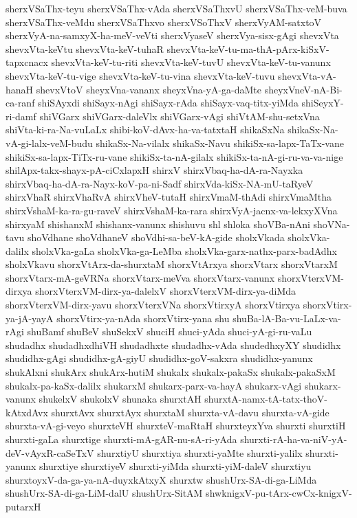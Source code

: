 {sherxVSaThx-teyu
sherxVSaThx-vAda
sherxVSaThxvU
sherxVSaThx-veM-buva
sherxVSaThx-veMdu
sherxVSaThxvo
sherxVSoThxV
sherxVyAM-satxtoV
sherxVyA-na-samxyX-ha-meV-veVti
sherxVyaseV
sherxVya-sisx-gAgi
shevxVta
shevxVta-keVtu
shevxVta-keV-tuhaR
shevxVta-keV-tu-ma-thA-pArx-kiSxV-tapxcnacx
shevxVta-keV-tu-riti
shevxVta-keV-tuvU
shevxVta-keV-tu-vanunx
shevxVta-keV-tu-vige
shevxVta-keV-tu-vina
shevxVta-keV-tuvu
shevxVta-vA-hanaH
shevxVtoV
sheyxVna-vananx
sheyxVna-yA-ga-daMte
sheyxVneV-nA-Bi-ca-ranf
shiSAyxdi
shiSayx-nAgi
shiSayx-rAda
shiSayx-vaq-titx-yiMda
shiSeyxY-ri-damf
shiVGarx
shiVGarx-daleVlx
shiVGarx-vAgi
shiVtAM-shu-setxVna
shiVta-ki-ra-Na-vuLaLx
shibi-koV-dAvx-ha-va-tatxtaH
shikaSxNa
shikaSx-Na-vA-gi-lalx-veM-budu
shikaSx-Na-vilalx
shikaSx-Navu
shikiSx-sa-lapx-TaTx-vane
shikiSx-sa-lapx-TiTx-ru-vane
shikiSx-ta-nA-gilalx
shikiSx-ta-nA-gi-ru-va-va-nige
shilApx-takx-shayx-pA-ciCxlapxH
shirxV
shirxVbaq-ha-dA-ra-Nayxka
shirxVbaq-ha-dA-ra-Nayx-koV-pa-ni-Sadf
shirxVda-kiSx-NA-mU-taRyeV
shirxVhaR
shirxVhaRvA
shirxVheV-tutaH
shirxVmaM-thAdi
shirxVmaMtha
shirxVshaM-ka-ra-gu-raveV
shirxVshaM-ka-rara
shirxVyA-jacnx-va-lekxyXVna
shirxyaM
shishanxM
shishanx-vanunx
shishuvu
shl
shloka
shoVBa-nAni
shoVNa-tavu
shoVdhane
shoVdhaneV
shoVdhi-sa-beV-kA-gide
sholxVkada
sholxVka-dalilx
sholxVka-gaLa
sholxVka-ga-LeMba
sholxVka-garx-nathx-parx-badAdhx
sholxVkavu
shorxVtArx-da-shurxtaM
shorxVtArxya
shorxVtarx
shorxVtarxM
shorxVtarx-mA-geVRNa
shorxVtarx-meVva
shorxVtarx-vanunx
shorxVterxVM-dirxya
shorxVterxVM-dirx-ya-dalelxV
shorxVterxVM-dirx-ya-diMda
shorxVterxVM-dirx-yavu
shorxVterxVNa
shorxVtirxyA
shorxVtirxya
shorxVtirx-ya-jA-yayA
shorxVtirx-ya-nAda
shorxVtirx-yana
shu
shuBa-lA-Ba-vu-LaLx-va-rAgi
shuBamf
shuBeV
shuSekxV
shuciH
shuci-yAda
shuci-yA-gi-ru-vaLu
shudadhx
shudadhxdhiVH
shudadhxte
shudadhx-vAda
shudedhxyXY
shudidhx
shudidhx-gAgi
shudidhx-gA-giyU
shudidhx-goV-sakxra
shudidhx-yanunx
shukAlxni
shukArx
shukArx-hutiM
shukalx
shukalx-pakaSx
shukalx-pakaSxM
shukalx-pa-kaSx-dalilx
shukarxM
shukarx-parx-va-hayA
shukarx-vAgi
shukarx-vanunx
shukelxV
shukolxV
shunaka
shurxtAH
shurxtA-namx-tA-tatx-thoV-kAtxdAvx
shurxtAvx
shurxtAyx
shurxtaM
shurxta-vA-davu
shurxta-vA-gide
shurxta-vA-gi-veyo
shurxteVH
shurxteV-maRtaH
shurxteyxYva
shurxti
shurxtiH
shurxti-gaLa
shurxtige
shurxti-mA-gAR-nu-sA-ri-yAda
shurxti-rA-ha-va-niV-yA-deV-vAyxR-caSeTxV
shurxtiyU
shurxtiya
shurxti-yaMte
shurxti-yalilx
shurxti-yanunx
shurxtiye
shurxtiyeV
shurxti-yiMda
shurxti-yiM-daleV
shurxtiyu
shurxtoyxV-da-ga-ya-nA-duyxkAtxyX
shurxtw
shushUrx-SA-di-ga-LiMda
shushUrx-SA-di-ga-LiM-dalU
shushUrx-SitAM
shwknigxV-pu-tArx-cwCx-knigxV-putarxH
}
